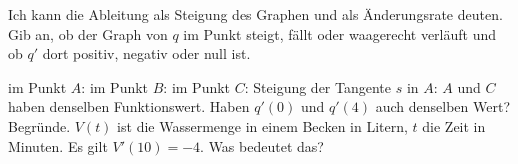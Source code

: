 \begin{aufgabe}{Ich kann die Ableitung als Steigung des Graphen und als Änderungsrate deuten.}
Gib an, ob der Graph von $q$ im Punkt steigt, fällt oder waagerecht verläuft und ob $q'$ dort positiv, negativ oder null ist.

\begin{ksys}[xmin=-1,xmax=6,ymin=-2,ymax=4,ablesen]
\end{ksys}

\begin{teile}
\teil im Punkt $A$: \leerfeld
\teil im Punkt $B$: \leerfeld
\teil im Punkt $C$: \leerfeld
{}
\teil Steigung der Tangente $s$ in $A$: \leerfeld
\teil $A$ und $C$ haben denselben Funktionswert. Haben $q'(0)$ und $q'(4)$ auch denselben Wert? Begründe.
\teil $V(t)$ ist die Wassermenge in einem Becken in Litern, $t$ die Zeit in Minuten. Es gilt $V'(10) = -4$. Was bedeutet das?
\end{teile}
\end{aufgabe}
